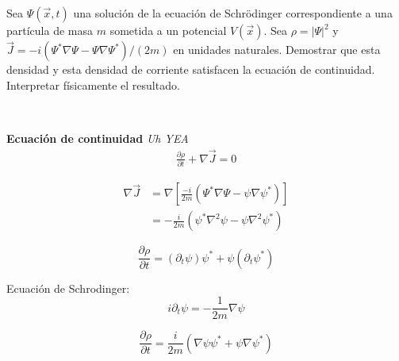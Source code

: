 Sea $\Psi(\vec{x},t)$ una solución de la ecuación de Schrödinger correspondiente a una partícula de masa $m$ sometida a un potencial $V(\vec{x})$. Sea $\rho=|\Psi|^{2} $ y $\vec{J}=-i\left(\Psi^{*} \nabla \Psi-\Psi \nabla \Psi^{*}\right) /(2 m)$ en unidades naturales. Demostrar que esta densidad y esta densidad de corriente satisfacen la ecuación de continuidad. Interpretar físicamente el resultado.

\begin{solution}\ \\
    \begin{tcolorbox}
        \textbf{
            Ecuación de continuidad
        } 
        \textit{
            Uh YEA
        }
        \begin{align*}
            \frac{\partial \rho}{\partial t} + \nabla \vec{J} = 0
        \end{align*}
    \end{tcolorbox}
    
    $$
    \begin{aligned}
    \nabla \vec{J} &=\nabla\left[\frac{-i}{2 m}\left(\Psi^{*} \nabla \Psi-\psi \nabla \psi^{*}\right)\right] \\
    &=-\frac{i}{2 m}\left(\psi^{*} \nabla^{2} \psi-\psi \nabla^{2} \psi^{*}\right)
    \end{aligned}
    $$
    
    $$
    \frac{\partial \rho}{\partial t}=\left(\partial_{t} \psi\right) \psi^{*}+\psi\left(\partial_{t} \psi^{*}\right)
    $$
    
    \begin{tcolorbox}
        Ecuación de Schrodinger:
        \begin{equation}
        i \partial_{t} \psi=-\frac{1}{2 m} \nabla \psi
        \end{equation}
    \end{tcolorbox}
    $$
    \frac{\partial \rho}{\partial t}=\frac{i}{2 m}\left(\nabla \psi \psi^{*}+\psi \nabla \psi^{*}\right)
    $$
    
    
\end{solution}